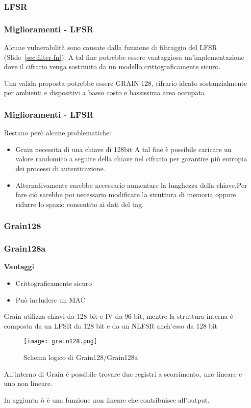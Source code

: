 \subsubsection{LFSR}
\begin{frame}
    \frametitle{Miglioramenti - LFSR}
    Alcune vulnerabilità sono causate dalla funzione di filtraggio del LFSR (Slide~\ref{sec:filter-fn}).
    A tal fine potrebbe essere vantaggiosa un'implementazione dove il cifrario venga sostituito da un modello crittograficamente sicuro.
    
    Una valida proposta potrebbe essere GRAIN-128, cifrario ideato sostanzialmente per ambienti e dispositivi a basso costo e bassissima area occupata\cite{gren2011grain}\cite{sonnerup2019efficient}
\end{frame}

\begin{frame}
    \frametitle{Miglioramenti - LFSR}
    Restano però alcune problematiche:
    \begin{itemize}
        \item <1-> Grain necessita di una chiave di 128bit\newline
                A tal fine è possibile caricare un valore randomico a seguire della chiave nel cifrario per garantire più entropia dei processi di autenticazione.
        \item <2-> Alternativamente sarebbe necessario aumentare la lunghezza della chiave.\newline Per fare ciò sarebbe poi necessario modificare la struttura di memoria oppure ridurre lo spazio consentito ai dati del tag.
    \end{itemize}
\end{frame}

\subsubsection{Grain128}
\begin{frame}[allowframebreaks]
    \frametitle{Grain128a}
    \textbf{Vantaggi}
    \begin{itemize}
        \item <1-> Crittograficamente sicuro
        \item <2-> Può includere un MAC
    \end{itemize}

    Grain utilizza chiavi da 128 bit e IV da 96 bit, mentre la struttura interna è composta da un LFSR da 128 bit e da un NLFSR anch'esso da 128 bit

    \begin{figure}
        \centering
        \texttt{[image: grain128.png]}
        \caption{Schema logico di Grain128/Grain128a}
    \end{figure}

    All'interno di Grain è possibile trovare due registri a scorrimento, uno lineare e uno non lineare.

    In aggiunta $h$ è una funzione non lineare che contribuisce all'output.
\end{frame}

